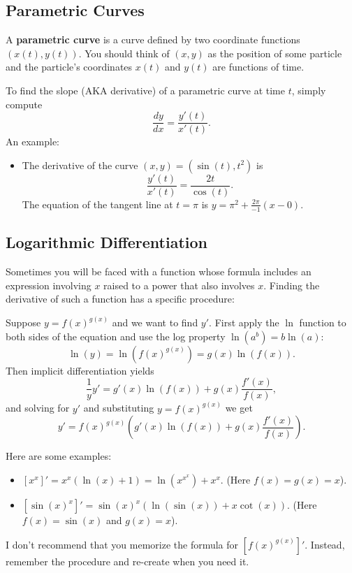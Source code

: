 \subsection{Parametric Curves}

A \textbf{parametric curve} is a curve defined by two coordinate functions $(x(t), y(t))$. You should think of $(x,y)$ as the position of some particle and the particle's coordinates $x(t)$ and $y(t)$ are functions of time.

To find the slope (AKA derivative) of a parametric curve at time $t$, simply compute
$$\frac{dy}{dx}=\frac{y'(t)}{x'(t)}.$$
An example:
\begin{itemize}
    \item The derivative of the curve $(x,y)=(\sin(t), t^2)$ is
    $$\frac{y'(t)}{x'(t)}=\frac{2t}{\cos(t)}.$$
    The equation of the tangent line at $t=\pi$ is $y=\pi^2+\frac{2\pi}{-1}(x-0).$
\end{itemize}

\subsection{Logarithmic Differentiation}

Sometimes you will be faced with a function whose formula includes an expression involving $x$ raised to a power that also involves $x$. Finding the derivative of such a function has a specific procedure:
\begin{strat}
Suppose $y=f(x)^{g(x)}$ and we want to find $y'$. First apply the $\ln$ function to both sides of the equation and use the log property $\ln(a^b)=b\ln(a)$:
$$\ln(y)=\ln(f(x)^{g(x)})=g(x)\ln(f(x)).$$
Then implicit differentiation yields
$$\frac{1}{y}y'=g'(x)\ln(f(x))+g(x)\frac{f'(x)}{f(x)},$$
and solving for $y'$ and substituting $y=f(x)^{g(x)}$ we get
$$y'=f(x)^{g(x)}\left(g'(x)\ln(f(x))+g(x)\frac{f'(x)}{f(x)}\right).$$
\end{strat}

Here are some examples:
\begin{itemize}
\item $[x^x]'=x^x(\ln(x)+1)=\ln(x^{x^x})+x^x$. (Here $f(x)=g(x)=x$).
\item $[\sin(x)^x]'=\sin(x)^x(\ln(\sin(x))+x\cot(x))$. (Here $f(x)=\sin(x)$ and $g(x)=x$). 
\end{itemize}

I don't recommend that you memorize the formula for $[f(x)^{g(x)}]'$. Instead, remember the procedure and re-create when you need it.


